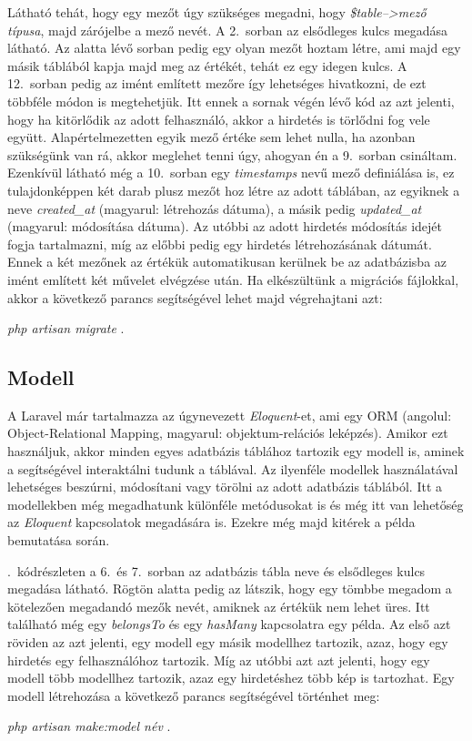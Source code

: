 \documentclass[]{thesis-ekf}
\theoremstyle{definition}
\theoremstyle{remark}
\begin{document}
		Látható tehát, hogy egy mezőt úgy szükséges megadni, hogy \emph{\$table-->mező típusa}, majd zárójelbe a mező nevét. A 2.~sorban az elsődleges kulcs megadása látható. Az alatta lévő sorban pedig egy olyan mezőt hoztam létre, ami majd egy másik táblából kapja majd meg az értékét, tehát ez egy idegen kulcs. A 12.~sorban pedig az imént említett mezőre így lehetséges hivatkozni, de ezt többféle módon is megtehetjük. Itt ennek a sornak végén lévő kód az azt jelenti, hogy ha kitörlődik az adott felhasználó, akkor a hirdetés is törlődni fog vele együtt. Alapértelmezetten egyik mező értéke sem lehet nulla, ha azonban szükségünk van rá, akkor meglehet tenni úgy, ahogyan én a 9.~sorban csináltam. Ezenkívül látható még a 10.~sorban egy \emph{timestamps} nevű mező definiálása is, ez tulajdonképpen két darab plusz mezőt hoz létre az adott táblában, az egyiknek a neve \emph{created\_at} (magyarul: létrehozás dátuma), a másik pedig \emph{updated\_at} (magyarul: módosítása dátuma). Az utóbbi az adott hirdetés módosítás idejét fogja tartalmazni, míg az előbbi pedig egy hirdetés létrehozásának dátumát. Ennek a két mezőnek az értékük automatikusan kerülnek be az adatbázisba az imént említett két művelet elvégzése után. Ha elkészültünk a migrációs fájlokkal, akkor a következő parancs segítségével lehet majd végrehajtani azt:
		\begin{center}
			\emph{php artisan migrate} .
		\end{center}
	\subsection{Modell}
		A Laravel már tartalmazza az úgynevezett \emph{Eloquent}-et, ami egy ORM (angolul: Object-Relational Mapping, magyarul: objektum-relációs leképzés). Amikor ezt használjuk, akkor minden egyes adatbázis táblához tartozik egy modell is, aminek a segítségével interaktálni tudunk a táblával. Az ilyenféle modellek használatával lehetséges beszúrni, módosítani vagy törölni az adott adatbázis táblából. Itt a modellekben még megadhatunk különféle metódusokat is és még itt van lehetőség az \emph{Eloquent} kapcsolatok megadására is. Ezekre még majd kitérek a példa bemutatása során.\cite{Laravel}
		
		
		
		.~kódrészleten a 6.~és 7.~sorban az adatbázis tábla neve és elsődleges kulcs megadása látható. Rögtön alatta pedig az látszik, hogy egy tömbbe megadom a kötelezően megadandó mezők nevét, amiknek az értékük nem lehet üres. Itt található még egy \emph{belongsTo} és egy \emph{hasMany} kapcsolatra egy példa. Az első azt röviden az azt jelenti, egy modell egy másik modellhez tartozik, azaz, hogy egy hirdetés egy felhasználóhoz tartozik. Míg az utóbbi azt azt jelenti, hogy egy modell több modellhez tartozik, azaz egy hirdetéshez több kép is tartozhat. Egy modell létrehozása a következő parancs segítségével történhet meg:
		\begin{center} 
			\emph{php artisan make:model név} .
		\end{center}
	
\end{document}
